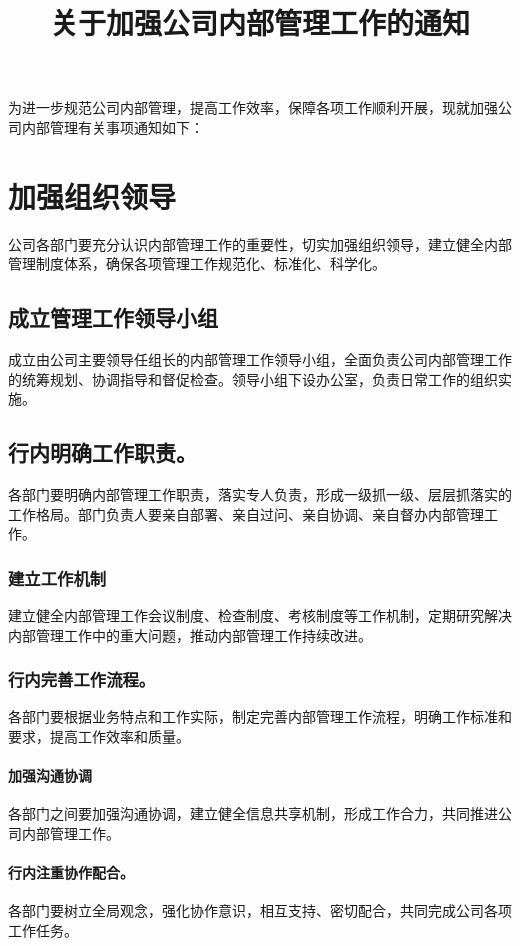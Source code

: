 \documentclass{common-doc}
\title{关于加强公司内部管理工作的通知}
\begin{document}
\maketitle

为进一步规范公司内部管理，提高工作效率，保障各项工作顺利开展，现就加强公司内部管理有关事项通知如下：

\section{加强组织领导}
公司各部门要充分认识内部管理工作的重要性，切实加强组织领导，建立健全内部管理制度体系，确保各项管理工作规范化、标准化、科学化。

\subsection{成立管理工作领导小组}
成立由公司主要领导任组长的内部管理工作领导小组，全面负责公司内部管理工作的统筹规划、协调指导和督促检查。领导小组下设办公室，负责日常工作的组织实施。

\subsection*{行内明确工作职责。}
各部门要明确内部管理工作职责，落实专人负责，形成一级抓一级、层层抓落实的工作格局。部门负责人要亲自部署、亲自过问、亲自协调、亲自督办内部管理工作。

\subsubsection{建立工作机制}
建立健全内部管理工作会议制度、检查制度、考核制度等工作机制，定期研究解决内部管理工作中的重大问题，推动内部管理工作持续改进。

\subsubsection*{行内完善工作流程。}
各部门要根据业务特点和工作实际，制定完善内部管理工作流程，明确工作标准和要求，提高工作效率和质量。

\paragraph{加强沟通协调}
各部门之间要加强沟通协调，建立健全信息共享机制，形成工作合力，共同推进公司内部管理工作。

\paragraph*{行内注重协作配合。}
各部门要树立全局观念，强化协作意识，相互支持、密切配合，共同完成公司各项工作任务。
\end{document}
